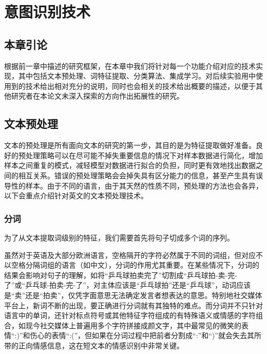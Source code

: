 \chapter{意图识别技术}
\label{cha:tech}

\section{本章引论}

根据前一章中描述的研究框架，在本章中我们将针对每一个功能介绍对应的技术实现，其中包括文本预处理、词特征提取、分类算法、集成学习。对后续实验用中使用到的技术给出相对充分的说明，同时也会相关的技术给出概要的描述，以便于其他研究者在本论文未深入探索的方向作出拓展性的研究。

\section{文本预处理}

文本的预处理是所有面向文本的研究的第一步，其目的是为特征提取做好准备。良好的预处理策略可以在尽可能不掉失重要信息的情况下对样本数据进行简化，增加样本之间重复的模式，减轻模型对数据进行拟合的负担，同时更有效地找出数据之间的相互关系。错误的预处理策略会会掉失具有区分能力的信息，甚至产生具有误导性的样本。由于不同的语言，由于其天然的性质不同，预处理的方法也会各异，以下会重点介绍针对英文的文本预处理技术。

\subsection{分词}

为了从文本提取词级别的特征，我们需要首先将句子切成多个词的序列。

虽然对于英语及大部分欧洲语言，空格隔开的字符必然属于不同的词组，但对应不以空格分隔词组的语言（如中文），分词的作用尤其重要。在某些情况下，分词的结果会影响对句子的理解，如将“乒乓球拍卖完了”切割成“乒乓球拍-卖-完-了”或“乒乓球-拍卖-完-了”，对主体应该是“乒乓球拍”还是“乒乓球”，动词应该是“卖”还是“拍卖”，仅凭字面意思无法确定发言者想表达的意思。特别地社交媒体平台上，新词不断的出现，要正确进行分词就有其独特的难点。而分词并不只针对语言中的单词，还针对标点符号或其他特征字符组成的有特殊语义或情感的字符组合，如现今社交媒体上普遍用多个字符拼接成颜文字，其中最常见的微笑的表情“:)”和伤心的表情“:(”，但如果在分词过程中把前者分割成“:”和“)”就会失去其所带的正向情感信息，这在短文本的情感识别中非常关键。

